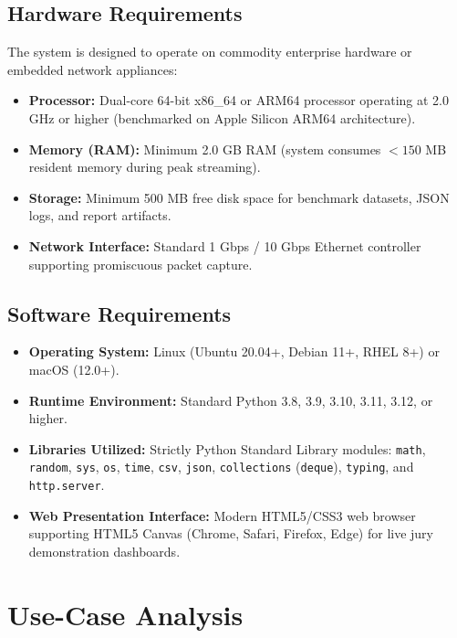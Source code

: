 \documentclass[12pt,a4paper,oneside]{report}
\begin{document}
\subsection{Hardware Requirements}
The system is designed to operate on commodity enterprise hardware or embedded network appliances:
\begin{itemize}
    \item \textbf{Processor:} Dual-core 64-bit x86\_64 or ARM64 processor operating at 2.0 GHz or higher (benchmarked on Apple Silicon ARM64 architecture).
    \item \textbf{Memory (RAM):} Minimum 2.0 GB RAM (system consumes $< 150$ MB resident memory during peak streaming).
    \item \textbf{Storage:} Minimum 500 MB free disk space for benchmark datasets, JSON logs, and report artifacts.
    \item \textbf{Network Interface:} Standard 1 Gbps / 10 Gbps Ethernet controller supporting promiscuous packet capture.
\end{itemize}

\subsection{Software Requirements}
\begin{itemize}
    \item \textbf{Operating System:} Linux (Ubuntu 20.04+, Debian 11+, RHEL 8+) or macOS (12.0+).
    \item \textbf{Runtime Environment:} Standard Python 3.8, 3.9, 3.10, 3.11, 3.12, or higher.
    \item \textbf{Libraries Utilized:} Strictly Python Standard Library modules: \texttt{math}, \texttt{random}, \texttt{sys}, \texttt{os}, \texttt{time}, \texttt{csv}, \texttt{json}, \texttt{collections} (\texttt{deque}), \texttt{typing}, and \texttt{http.server}.
    \item \textbf{Web Presentation Interface:} Modern HTML5/CSS3 web browser supporting HTML5 Canvas (Chrome, Safari, Firefox, Edge) for live jury demonstration dashboards.
\end{itemize}

\section{Use-Case Analysis}
\end{document}
